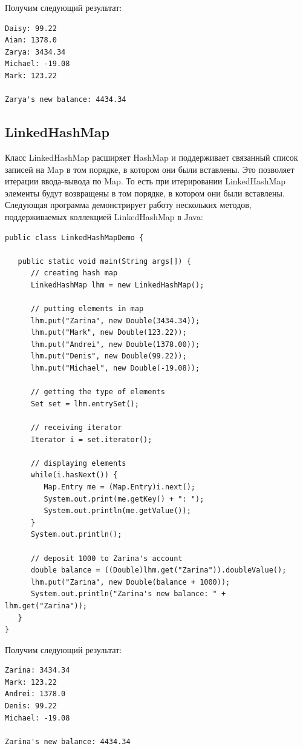 Получим следующий результат:

\begin{lstlisting}
Daisy: 99.22
Aian: 1378.0
Zarya: 3434.34
Michael: -19.08
Mark: 123.22

Zarya's new balance: 4434.34
\end{lstlisting}


\subsection{LinkedHashMap}
Класс LinkedHashMap расширяет HashMap и поддерживает связанный список записей на Map в том порядке, в котором они были вставлены. Это позволяет итерации ввода-вывода по Map. То есть при итерировании LinkedHashMap элементы будут возвращены в том порядке, в котором они были вставлены. Следующая программа демонстрирует работу нескольких методов, поддерживаемых коллекцией LinkedHashMap в Java:

\begin{lstlisting}
public class LinkedHashMapDemo {

   public static void main(String args[]) {
      // creating hash map
      LinkedHashMap lhm = new LinkedHashMap();
      
      // putting elements in map
      lhm.put("Zarina", new Double(3434.34));
      lhm.put("Mark", new Double(123.22));
      lhm.put("Andrei", new Double(1378.00));
      lhm.put("Denis", new Double(99.22));
      lhm.put("Michael", new Double(-19.08));
      
      // getting the type of elements
      Set set = lhm.entrySet();
      
      // receiving iterator
      Iterator i = set.iterator();
      
      // displaying elements
      while(i.hasNext()) {
         Map.Entry me = (Map.Entry)i.next();
         System.out.print(me.getKey() + ": ");
         System.out.println(me.getValue());
      }
      System.out.println();
      
      // deposit 1000 to Zarina's account
      double balance = ((Double)lhm.get("Zarina")).doubleValue();
      lhm.put("Zarina", new Double(balance + 1000));
      System.out.println("Zarina's new balance: " + lhm.get("Zarina"));
   }
}
\end{lstlisting}

Получим следующий результат:

\begin{lstlisting}
Zarina: 3434.34
Mark: 123.22
Andrei: 1378.0
Denis: 99.22
Michael: -19.08

Zarina's new balance: 4434.34
\end{lstlisting}

